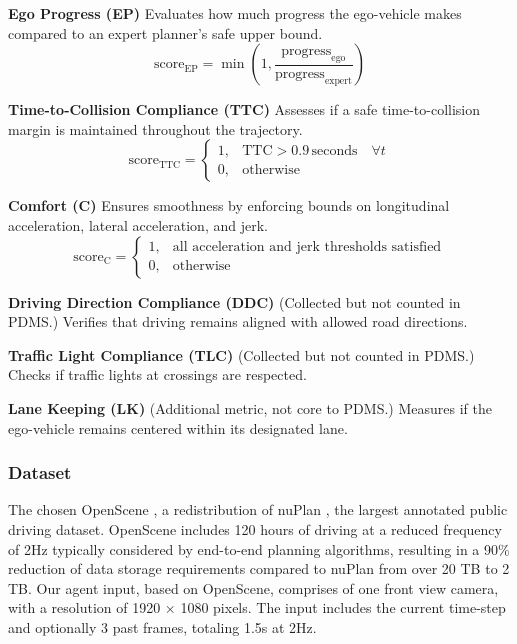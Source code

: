 \documentclass{article}
\begin{document}
\textbf{Ego Progress (EP)}
Evaluates how much progress the ego-vehicle makes compared to an expert planner's safe upper bound.
\begin{equation}
    \text{score}_{\text{EP}} = \min\left( 1, \frac{\text{progress}_{\text{ego}}}{\text{progress}_{\text{expert}}} \right)
\end{equation}

\textbf{Time-to-Collision Compliance (TTC)}
Assesses if a safe time-to-collision margin is maintained throughout the trajectory.
\begin{equation}
    \text{score}_{\text{TTC}} =
    \begin{cases}
        1, & \text{TTC} > 0.9 \, \text{seconds} \quad \forall t \\
        0, & \text{otherwise}
    \end{cases}
\end{equation}

\textbf{Comfort (C)}
Ensures smoothness by enforcing bounds on longitudinal acceleration, lateral acceleration, and jerk.
\begin{equation}
    \text{score}_{\text{C}} =
    \begin{cases}
        1, & \text{all acceleration and jerk thresholds satisfied} \\
        0, & \text{otherwise}
    \end{cases}
\end{equation}

\textbf{Driving Direction Compliance (DDC)}
(Collected but not counted in PDMS.) Verifies that driving remains aligned with allowed road directions.

\textbf{Traffic Light Compliance (TLC)}
(Collected but not counted in PDMS.) Checks if traffic lights at crossings are respected.

\textbf{Lane Keeping (LK)}
(Additional metric, not core to PDMS.) Measures if the ego-vehicle remains centered within its designated lane.

\subsubsection{Dataset}
The  chosen OpenScene \cite{OpenScene2023}, a redistribution of nuPlan \cite{karnchanachari2024nuplan}, the largest annotated public driving dataset. OpenScene
includes 120 hours of driving at a reduced frequency of 2Hz typically considered by end-to-end
planning algorithms, resulting in a 90\% reduction of data storage requirements compared to nuPlan
from over 20 TB to 2 TB. Our agent input, based on OpenScene, comprises of one front view camera, with a resolution of 1920 × 1080 pixels. The input
includes the current time-step and optionally 3 past frames, totaling 1.5s at 2Hz.\cite{dauner2024navsim}
\end{document}
